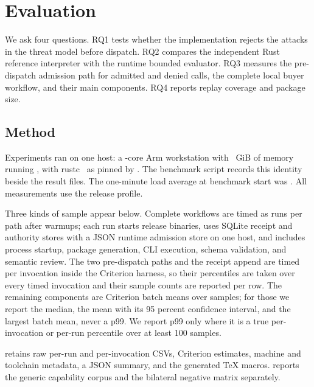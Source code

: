 \section{Evaluation}
\label{sec:evaluation}

We ask four questions. RQ1 tests whether the implementation rejects the
attacks in the threat model before dispatch. RQ2 compares the independent Rust
reference interpreter with the runtime bounded evaluator. RQ3 measures the
pre-dispatch admission path for admitted and denied calls, the complete local
buyer workflow, and their main components. RQ4 reports replay coverage and
package size.

\subsection{Method}

Experiments ran on one host: a \PSHostCores-core Arm \PSHostCpuModel{}
workstation with \PSHostMemoryGiB~GiB of memory running \PSHostOs, with
rustc~\PSRustcVersion{} as pinned by . The
benchmark script records this identity beside the result files. The
one-minute load average at benchmark start was \PSHostLoadAverage. All
measurements use the release profile.

Three kinds of sample appear below. Complete workflows are timed as
\PSPathSampleCount{} runs per path after \PSWarmupCount{} warmups; each run
starts release binaries, uses SQLite receipt and authority stores with a JSON
runtime admission store on one host, and includes process startup, package
generation, CLI execution, schema validation, and semantic review. The two
pre-dispatch paths and the receipt append are timed per invocation inside the
Criterion harness, so their percentiles are taken over every timed invocation
and their sample counts are reported per row. The remaining components are
Criterion batch means over \PSCriterionSampleCount{} samples; for those we
report the median, the mean with its 95 percent confidence interval, and the
largest batch mean, never a p99. We report p99 only where it is a true
per-invocation or per-run percentile over at least 100 samples.

 retains raw per-run and per-invocation
CSVs, Criterion estimates, machine and toolchain metadata, a JSON summary, and
the generated \TeX{} macros.  reports the
generic capability corpus and the bilateral negative matrix separately.

